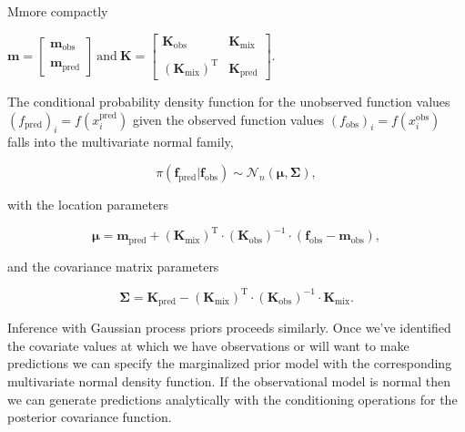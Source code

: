          \vspace{1em}
         
         Mmore compactly

         \vspace{1em}

         \(\mathbf{m} = 
         \begin{bmatrix}
            \mathbf{m}_{\text{obs}} \\
            \\
            \mathbf{m}_{\text{pred}}
         \end{bmatrix}  
         \: 
         \text{and}
         \:
         \mathbf{K} = 
         \begin{bmatrix}
            \mathbf{K}_{\text{obs}} & \mathbf{K}_{\text{mix}} \\
            \\
            (\mathbf{K}_{\text{mix}})^{\text{T}} & \mathbf{K}_{\text{pred}}
         \end{bmatrix}\).

         \vspace{1em}

         The conditional probability density function for the unobserved function values \((f_{\text{pred}})_{i} = f(x_{i}^{\text{pred}})\) given the observed function values  \((f_{\text{obs}})_{i} = f(x_{i}^{\text{obs}})\) falls into the multivariate normal family,

         \[\pi(\mathbf{f}_{\text{pred}} | \mathbf{f}_{\text{obs}}) \sim \mathcal{N}_{n}(\boldsymbol{\mu}, \boldsymbol{\Sigma}),\]

         with the location parameters 

         \[\boldsymbol{\mu} = \mathbf{m}_{\text{pred}} + (\mathbf{K}_{\text{mix}})^{\text{T}} \cdot (\mathbf{K}_{\text{obs}})^{-1} \cdot (\mathbf{f}_{\text{obs}} - \mathbf{m}_{\text{obs}}),\]

         and the covariance matrix parameters

         \[\boldsymbol{\Sigma} = \mathbf{K}_{\text{pred}} - (\mathbf{K}_{\text{mix}})^{\text{T}} \cdot (\mathbf{K}_{\text{obs}})^{-1} \cdot \mathbf{K}_{\text{mix}}.\]

         Inference with Gaussian process priors proceeds similarly. Once we've identified the covariate values at which we have observations or will want to make predictions we can specify the marginalized prior model with the corresponding multivariate normal density function. If the observational model is normal then we can generate predictions analytically with the conditioning operations for the posterior covariance function.
